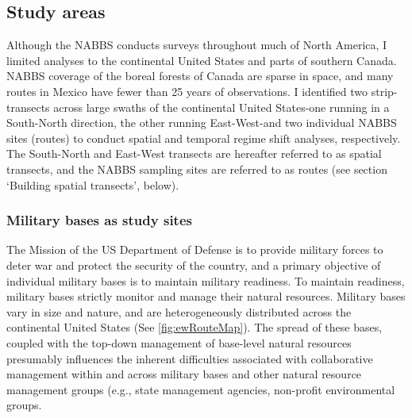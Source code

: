 \documentclass[12pt,twoside]{reedthesis}
\begin{document}
\hypertarget{study-areas}{%
\subsection{Study areas}\label{study-areas}}

Although the NABBS conducts surveys throughout much of North America, I limited analyses to the continental United States and parts of southern Canada. NABBS coverage of the boreal forests of Canada are sparse in space, and many routes in Mexico have fewer than 25 years of observations. I identified two strip-transects across large swaths of the continental United States-one running in a South-North direction, the other running East-West-and two individual NABBS sites (routes) to conduct spatial and temporal regime shift analyses, respectively. The South-North and East-West transects are hereafter referred to as spatial transects, and the NABBS sampling sites are referred to as routes (see section `Building spatial transects', below).

\hypertarget{military-bases-as-study-sites}{%
\subsubsection{Military bases as study sites}\label{military-bases-as-study-sites}}

The Mission of the US Department of Defense is to provide military forces to deter war and protect the security of the country, and a primary objective of individual military bases is to maintain military readiness. To maintain readiness, military bases strictly monitor and manage their natural resources. Military bases vary in size and nature, and are heterogeneously distributed across the continental United States (See \ref{fig:ewRouteMap}). The spread of these bases, coupled with the top-down management of base-level natural resources presumably influences the inherent difficulties associated with collaborative management within and across military bases and other natural resource management groups (e.g., state management agencies, non-profit environmental groups.
\end{document}
